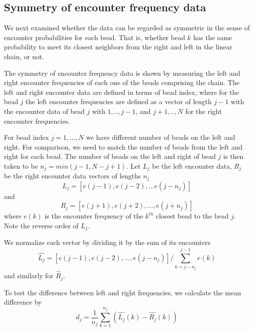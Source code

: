 \documentclass[12pt]{paper}
\begin{document}
\subsection{Symmetry of encounter frequency data}
We next examined whether the data can be regarded as symmetric in the sense of encounter probabilities for each bead. That is, whether bead $k$ has the same probability to meet its closest neighbors from the right and left in the linear chain, or not.  

The symmetry of encounter frequency data is shown by measuring the left and right encounter frequencies of each one of the beads comprising the chain.
The left and right encounter data are defined in terms of bead index, where for the bead $j$ the left encounter frequencies are defined as a vector of length $j-1$ with the encounter data of bead $j$ with $1,..,j-1$, and $j+1,..,N$ for the right encounter frequencies. 

For bead index $j=1,...,N$ we have different number of beads on the left and right. For comparison, we need to match the number of beads from the left and right for each bead. The number of beads on the left and right of bead $j$ is then taken to be $n_j=min(j-1,N-j+1)$. 
Let $L_j$ be the left encounter data, $R_j$ be the right encounter data vectors of lengths $n_j$
\begin{equation*}
L_j=\left[e(j-1),e(j-2),...e(j-n_j)\right] 
\end{equation*}
and 
\begin{equation*}
R_j=\left[e(j+1), e(j+2),...,e(j+n_j)\right]
\end{equation*}
where $e(k)$ is the encounter frequency of the $k^{th}$ closest bead to the bead $j$. Note the reverse order of $L_j$.

We normalize each vector by dividing it by the sum of its encounters
\begin{equation*}
\hat{L_j} =\left[e(j-1),e(j-2),...,e(j-n_j)\right]/\sum_{k=j-n_j}^{j-1}e(k)
\end{equation*}
and similarly for $\hat{R}_j$.

To test the difference between left and right frequencies, we calculate the mean difference by 
\begin{equation*}
d_j=\frac{1}{n_j}\sum_{k=1}^{n_j} \left(\hat{L_j}(k)-\hat{R_j}(k)\right)
\end{equation*}
\end{document}
